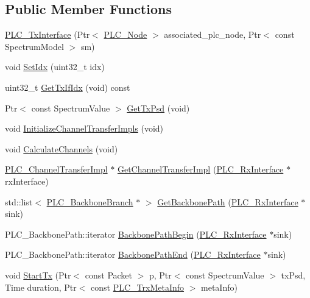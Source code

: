 \subsection*{\-Public \-Member \-Functions}
\begin{DoxyCompactItemize}
\item 
\hyperlink{classns3_1_1PLC__TxInterface_aff6a3c7efa2b90340580e72006525267}{\-P\-L\-C\-\_\-\-Tx\-Interface} (\-Ptr$<$ \hyperlink{classns3_1_1PLC__Node}{\-P\-L\-C\-\_\-\-Node} $>$ associated\-\_\-plc\-\_\-node, \-Ptr$<$ const \-Spectrum\-Model $>$ sm)
\item 
void \hyperlink{classns3_1_1PLC__TxInterface_a88a9bf7b50d5fa11a5adcb09b5398239}{\-Set\-Idx} (uint32\-\_\-t idx)
\item 
uint32\-\_\-t \hyperlink{classns3_1_1PLC__TxInterface_ad89273d8968ace83a49c39bbe3bab3fc}{\-Get\-Tx\-If\-Idx} (void) const 
\item 
\-Ptr$<$ const \-Spectrum\-Value $>$ \hyperlink{classns3_1_1PLC__TxInterface_a85f0732d7d01349f56d6bcbecc3e3c62}{\-Get\-Tx\-Psd} (void)
\item 
void \hyperlink{classns3_1_1PLC__TxInterface_ad6c95936608eeb3b081f9b8eb5e46c87}{\-Initialize\-Channel\-Transfer\-Impls} (void)
\item 
void \hyperlink{classns3_1_1PLC__TxInterface_a9d5e237a329135b8f73178200f94bbc9}{\-Calculate\-Channels} (void)
\item 
\hyperlink{classns3_1_1PLC__ChannelTransferImpl}{\-P\-L\-C\-\_\-\-Channel\-Transfer\-Impl} $\ast$ \hyperlink{classns3_1_1PLC__TxInterface_abcb48efd0fa3c23f04646e93e6c7ebbe}{\-Get\-Channel\-Transfer\-Impl} (\hyperlink{classns3_1_1PLC__RxInterface}{\-P\-L\-C\-\_\-\-Rx\-Interface} $\ast$rx\-Interface)
\item 
std\-::list$<$ \hyperlink{classns3_1_1PLC__BackboneBranch}{\-P\-L\-C\-\_\-\-Backbone\-Branch} $\ast$ $>$ \hyperlink{classns3_1_1PLC__TxInterface_a13001bc1b0947eac4b31d3f86dfbc848}{\-Get\-Backbone\-Path} (\hyperlink{classns3_1_1PLC__RxInterface}{\-P\-L\-C\-\_\-\-Rx\-Interface} $\ast$sink)
\item 
\-P\-L\-C\-\_\-\-Backbone\-Path\-::iterator \hyperlink{classns3_1_1PLC__TxInterface_a7a0f421716fa2999885f3dfa9e00649e}{\-Backbone\-Path\-Begin} (\hyperlink{classns3_1_1PLC__RxInterface}{\-P\-L\-C\-\_\-\-Rx\-Interface} $\ast$sink)
\item 
\-P\-L\-C\-\_\-\-Backbone\-Path\-::iterator \hyperlink{classns3_1_1PLC__TxInterface_abef68692750f3bb5a11bf6c37d1b3af6}{\-Backbone\-Path\-End} (\hyperlink{classns3_1_1PLC__RxInterface}{\-P\-L\-C\-\_\-\-Rx\-Interface} $\ast$sink)
\item 
void \hyperlink{classns3_1_1PLC__TxInterface_ac45fd62e1c2e924026df7b04acb6d0b4}{\-Start\-Tx} (\-Ptr$<$ const \-Packet $>$ p, \-Ptr$<$ const \-Spectrum\-Value $>$ tx\-Psd, \-Time duration, \-Ptr$<$ const \hyperlink{classns3_1_1PLC__TrxMetaInfo}{\-P\-L\-C\-\_\-\-Trx\-Meta\-Info} $>$ meta\-Info)
\end{DoxyCompactItemize}
